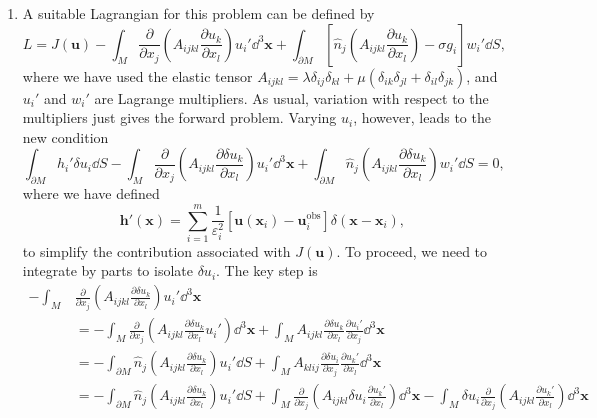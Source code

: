 \documentclass[a4paper,10pt]{paper}
\begin{document}
\begin{enumerate}
\item A suitable Lagrangian for this problem can be defined by
\begin{equation*}
    L=J(\mathbf{u})-\int_{M}\frac{\partial}{\partial x_{j}}\left(A_{ijkl}\frac{\partial u_{k}}{\partial x_{l}}\right)u_{i}'\dd^{3}\mathbf{x}+\int_{\partial M}\left[\hat{n}_{j}\left(A_{ijkl}\frac{\partial u_{k}}{\partial x_{l}}\right)-\sigma g_{i}\right]w_{i}'\dd S,
\end{equation*}
where we have used the elastic tensor $A_{ijkl}=\lambda\delta_{ij}\delta_{kl}+\mu(\delta_{ik}\delta_{jl}+\delta_{il}\delta_{jk})$, and $u_{i}'$ and $w_{i}'$ are Lagrange multipliers. As usual, variation with respect to the multipliers just gives the forward problem. Varying $u_{i}$, however, leads to the new condition
\begin{equation*}
    \int_{\partial M}h_{i}'\delta u_{i}\dd S-\int_{M}\frac{\partial}{\partial x_{j}}\left(A_{ijkl}\frac{\partial\delta u_{k}}{\partial x_{l}}\right)u_{i}'\dd^{3}\mathbf{x}+\int_{\partial M}\hat{n}_{j}\left(A_{ijkl}\frac{\partial\delta u_{k}}{\partial x_{l}}\right)w_{i}'\dd S=0,
\end{equation*}
where we have defined
\begin{equation*}
    \mathbf{h}'(\mathbf{x})=\sum_{i=1}^{m}\frac{1}{\varepsilon_{i}^{2}}[\mathbf{u}(\mathbf{x}_{i})-\mathbf{u}_{i}^{\mathrm{obs}}]\delta(\mathbf{x}-\mathbf{x}_{i}),
\end{equation*}
to simplify the contribution associated with $J(\mathbf{u})$. To proceed, we need to integrate by parts to isolate $\delta u_{i}$. The key step is
\begin{align*}
    -\int_{M}&\frac{\partial}{\partial x_{j}}\left(A_{ijkl}\frac{\partial\delta u_{k}}{\partial x_{l}}\right)u_{i}'\dd^{3}\mathbf{x} \\
    &=-\int_{M}\frac{\partial}{\partial x_{j}}\left(A_{ijkl}\frac{\partial\delta u_{k}}{\partial x_{l}}u_{i}'\right)\dd^{3}\mathbf{x}+\int_{M}A_{ijkl}\frac{\partial\delta u_{k}}{\partial x_{l}}\frac{\partial u_{i}'}{\partial x_{j}}\dd^{3}\mathbf{x} \\
    &=-\int_{\partial M}\hat{n}_{j}\left(A_{ijkl}\frac{\partial\delta u_{k}}{\partial x_{l}}\right)u_{i}'\dd S+\int_{M}A_{klij}\frac{\partial\delta u_{i}}{\partial x_{j}}\frac{\partial u_{k}'}{\partial x_{l}}\dd^{3}\mathbf{x} \\
    &=-\int_{\partial M}\hat{n}_{j}\left(A_{ijkl}\frac{\partial\delta u_{k}}{\partial x_{l}}\right)u_{i}'\dd S+\int_{M}\frac{\partial}{\partial x_{j}}\left(A_{ijkl}\delta u_{i}\frac{\partial u_{k}'}{\partial x_{l}}\right)\dd^{3}\mathbf{x} -\int_{M}\delta u_{i}\frac{\partial}{\partial x_{j}}\left(A_{ijkl}\frac{\partial u_{k}'}{\partial x_{l}}\right)\dd^{3}\mathbf{x} \\

\end{align*}
\end{enumerate}
\end{document}
